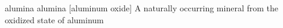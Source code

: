 \newglsXchemical%
{alumina}%
{alumina}%
[aluminum oxide]%
{}%
{A naturally occurring mineral from the oxidized state of aluminum}%